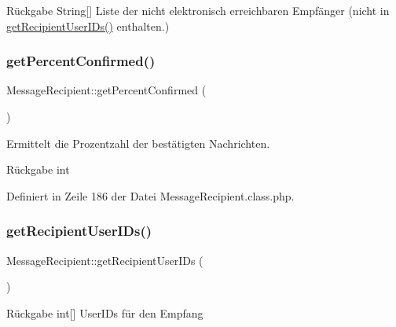 \begin{DoxyReturn}{Rückgabe}
String\mbox{[}\mbox{]} Liste der nicht elektronisch erreichbaren Empfänger (nicht in \mbox{\hyperlink{class_message_recipient_a4e2b6cab31e815a8e894ae5a860887a0}{get\+Recipient\+User\+I\+Ds()}} enthalten.) 
\end{DoxyReturn}
\mbox{\label{class_message_recipient_a1762af3cbc0d04dd81eae942f8fc0172}} 
\subsubsection{\texorpdfstring{get\+Percent\+Confirmed()}{getPercentConfirmed()}}
{\footnotesize\ttfamily Message\+Recipient\+::get\+Percent\+Confirmed (\begin{DoxyParamCaption}{ }\end{DoxyParamCaption})}

Ermittelt die Prozentzahl der bestätigten Nachrichten. \begin{DoxyReturn}{Rückgabe}
int 
\end{DoxyReturn}


Definiert in Zeile 186 der Datei Message\+Recipient.\+class.\+php.

\mbox{\label{class_message_recipient_a4e2b6cab31e815a8e894ae5a860887a0}} 
\subsubsection{\texorpdfstring{get\+Recipient\+User\+I\+Ds()}{getRecipientUserIDs()}}
{\footnotesize\ttfamily Message\+Recipient\+::get\+Recipient\+User\+I\+Ds (\begin{DoxyParamCaption}{ }\end{DoxyParamCaption})\hspace{0.3cm}{\ttfamily [abstract]}}

\begin{DoxyReturn}{Rückgabe}
int\mbox{[}\mbox{]} User\+I\+Ds für den Empfang 
\end{DoxyReturn}
\mbox{\label{class_message_recipient_abe6c45dd132b1182089eb936f8034d02}} 
